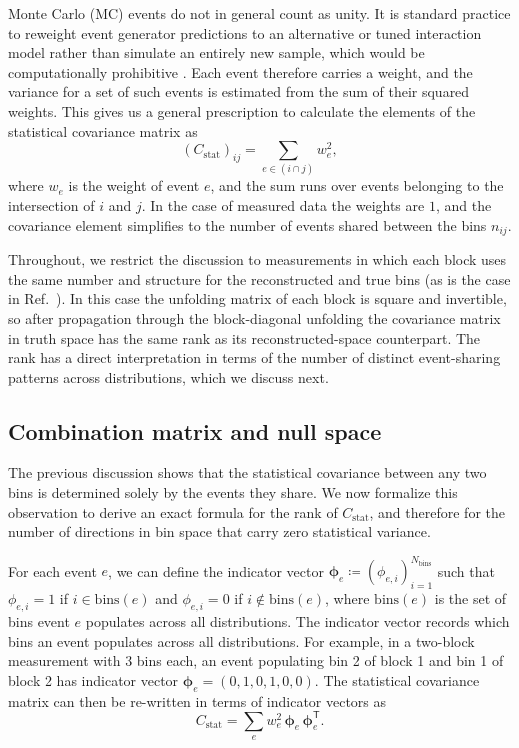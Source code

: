 \documentclass[a4paper,11pt]{article}
\begin{document}
Monte Carlo (MC) events do not in general count as unity. It is standard practice to reweight event generator predictions to an alternative or tuned interaction model rather than simulate an entirely new sample, which would be computationally prohibitive \cite{NOvA:2020rbg,MicroBooNE:2021ccs}. Each event therefore carries a weight, and the variance for a set of such events is estimated from the sum of their squared weights. This gives us a general prescription to calculate the elements of the statistical covariance matrix as
\begin{equation}\label{eq:cstat_elements}
    (C_{\text{stat}})_{ij} = \sum_{e \in (i \cap j)} w_{e}^{2},
\end{equation}
where $w_{e}$ is the weight of event $e$, and the sum runs over events belonging to the intersection of $i$ and $j$. In the case of measured data the weights are $1$, and the covariance element simplifies to the number of events shared between the bins $n_{ij}$.

Throughout, we restrict the discussion to measurements in which each block uses the same number and structure for the reconstructed and true bins (as is the case in Ref.~\cite{MicroBooNE:2024yzp}). In this case the unfolding matrix of each block is square and invertible, so after propagation through the block-diagonal unfolding the covariance matrix in truth space has the same rank as its reconstructed-space counterpart. The rank has a direct interpretation in terms of the number of distinct event-sharing patterns across distributions, which we discuss next.

\subsection{Combination matrix and null space}
\label{subsec:combination_matrix}

The previous discussion shows that the statistical covariance between any two bins is determined solely by the events they share. We now formalize this observation to derive an exact formula for the rank of $C_{\text{stat}}$, and therefore for the number of directions in bin space that carry zero statistical variance.

For each event $e$, we can define the indicator vector $\boldsymbol{\phi}_{e} \coloneqq (\phi_{e,i})_{i = 1}^{N_{\text{bins}}}$ such that $\phi_{e,i} = 1$ if $i \in \text{bins}(e)$ and $\phi_{e,i} = 0$ if $i \notin \text{bins}(e)$, where $\text{bins}(e)$ is the set of bins event $e$ populates across all distributions. The indicator vector records which bins an event populates across all distributions. For example, in a two-block measurement with 3 bins each, an event populating bin 2 of block 1 and bin 1 of block 2 has indicator vector $\boldsymbol{\phi}_{e} = (0,1,0,1,0,0)$. The statistical covariance matrix can then be re-written in terms of indicator vectors as
\begin{equation}\label{eq:cstat_outer}
    C_{\text{stat}} = \sum_{e} w_{e}^{2} \, \boldsymbol{\phi}_{e} \, \boldsymbol{\phi}_{e}^{\mathsf{T}}.
\end{equation}
\end{document}
